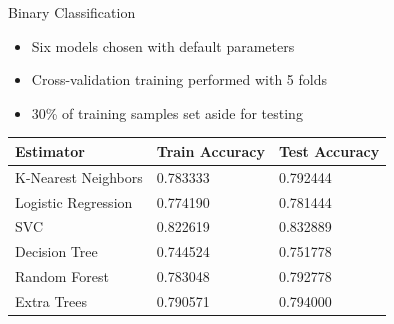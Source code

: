 \documentclass[aspectratio=169,handout]{beamer}
\begin{document}
\begin{frame}{Binary Classification}

  \begin{itemize}
  \item Six models chosen with default parameters
  \item Cross-validation  training performed with 5 folds
  \item 30\% of training samples set aside for testing
  \end{itemize}


  \begin{center}
    \begin{tabular}{|l|l|l|}
      \hline
      Estimator & Train Accuracy & Test Accuracy \\
      \hline
      K-Nearest Neighbors & 0.783333 & 0.792444 \\
      Logistic Regression & 0.774190 & 0.781444 \\
      SVC & 0.822619 & 0.832889 \\
      Decision Tree & 0.744524 & 0.751778 \\
      Random Forest & 0.783048 & 0.792778 \\
      Extra Trees & 0.790571 & 0.794000 \\
      \hline
    \end{tabular}
  \end{center}


\end{frame}
\end{document}
